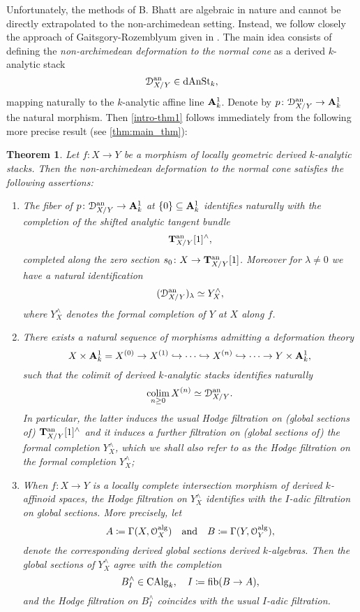 \documentclass[10pt,a4paper,reqno]{amsart} %
\theoremstyle{plain}
\newtheorem{thm}{Theorem}[section]
\theoremstyle{definition}
\theoremstyle{remark}
\numberwithin{equation}{section}
\begin{document}
Unfortunately, the methods of B. Bhatt are algebraic in nature and cannot be directly extrapolated to the non-archimedean setting. Instead, we follow closely the
approach of Gaitsgory-Rozemblyum given in \cite[\S 9]{Gaitsgory_Study_II}. The main idea consists of defining the \emph{non-archimedean deformation
to the normal cone} as a derived $k$-analytic stack
    \[
        \mathcal D^\mathrm{an}_{X/ Y} \in \mathrm{dAnSt}_k,  
    \]
mapping naturally to the $k$-analytic affine line $\mathbf A^1_k$. Denote by $p \colon \mathcal D_{X/ Y}^\mathrm{an} \to \mathbf A^1_k$ the natural morphism. Then
\cref{intro-thm1} follows immediately from the following more precise result (see \cref{thm:main_thm}):

\begin{thm} \label{intro-thm2}
    Let $f \colon X \to Y$ be a morphism of locally geometric derived $k$-analytic stacks. Then the non-archimedean deformation to the normal cone satisfies the following
    assertions:
    \begin{enumerate}
        \item The fiber of $p \colon \mathcal D_{X/ Y}^\mathrm{an} \to \mathbf A^1_k$ at $\{ 0\} \subseteq \mathbf A^1_k$ identifies naturally with the completion of the shifted analytic
        tangent bundle
            \[
                \mathbf T^\mathrm{an}_{X/ Y}[1]^\wedge,  
            \]
        completed along the zero section $s_0 \colon X \to \mathbf T^\mathrm{an}_{X/ Y}[1]$. Moreover for $\lambda \neq 0$ we have a natural identification
            \[
                (\mathcal D_{X/ Y}^\mathrm{an})_\lambda  \simeq Y^\wedge_X,
            \]
        where $Y^\wedge_X$ denotes the formal completion of $Y$ at $X$ along $f$.
        \item There exists a natural sequence of morphisms admitting a deformation theory
            \[
                X \times \mathbf A^1_k = X^{(0)} \to X^{(1)} \hookrightarrow \dots \hookrightarrow X^{(n)} \hookrightarrow \dots \to Y \times \mathbf A^1_k, 
            \]
        such that the colimit of derived $k$-analytic stacks identifies naturally
            \[
                \operatorname*{colim}_{n \ge 0} X^{(n)} \simeq \mathcal D_{X/ Y}^\mathrm{an}.  
            \]
        In particular, the latter induces the usual Hodge filtration on (global sections of) $\mathbf T^\mathrm{an}_{X/ Y}[1]^\wedge$ and it induces a further filtration
        on (global sections of) the formal completion $Y^\wedge_X$, which we shall also refer to as the \emph{Hodge filtration} on the formal completion $Y^\wedge_X$;
        \item When $f \colon X \to Y$ is a locally complete intersection morphism of derived $k$-affinoid spaces, the Hodge filtration on $Y^\wedge_X$ identifies with the $I$-adic filtration on global sections.
        More precisely, let
            \[A \coloneqq \Gamma(X, \mathcal O_X^\mathrm{alg}) \quad \mathrm{and} \quad B \coloneqq \Gamma(Y, \mathcal O_Y^\mathrm{alg}),\]
        denote the corresponding derived global sections derived $k$-algebras. Then the global sections of
        $Y^\wedge_X$ agree with the completion
            \[
                B^\wedge_I \in \mathrm{CAlg}_k, \quad I \coloneqq \mathrm{fib}(B \to A),  
            \]
        and the Hodge filtration on $B^\wedge_I$ coincides with the usual $I$-adic filtration.
    \end{enumerate}
\end{thm}
\end{document}
